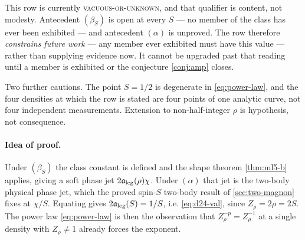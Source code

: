 \begin{scope}
\label{scope:d24-val}
This row is currently \textsc{vacuous-or-unknown}, and that qualifier is
content, not modesty. Antecedent $(\beta_S)$ is open at every $S$ --- no member
of the class has ever been exhibited --- and antecedent $(\alpha)$ is unproved.
The row therefore \emph{constrains future work} --- any member ever exhibited
must have this value --- rather than supplying evidence now. It cannot be
upgraded past that reading until a member is exhibited or the conjecture
\cref{conj:amp} closes.

Two further cautions. The point $S=1/2$ is degenerate in
\cref{eq:power-law}, and the four densities at which the row is stated are
four points of one analytic curve, not four independent measurements.
Extension to non-half-integer $\rho$ is hypothesis, not consequence.
\end{scope}

\paragraph{Idea of proof.} Under $(\beta_S)$ the class constant is defined and
the shape theorem \cref{thm:ml5-b} applies, giving a soft phase jet
$2\mathfrak{a}_{\mathrm{leg}}(\rho)\chi$. Under $(\alpha)$ that jet is the two-body physical phase
jet, which the proved spin-$S$ two-body result of \cref{sec:two-magnon} fixes
at $\chi/S$. Equating gives $2\mathfrak{a}_{\mathrm{leg}}(S)=1/S$, i.e. \cref{eq:d24-val}, since
$Z_\rho=2\rho=2S$. The power law \cref{eq:power-law} is then the observation
that $Z_\rho^{-p}=Z_\rho^{-1}$ at a single density with $Z_\rho\neq1$ already
forces the exponent.


